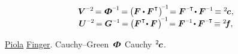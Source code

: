 \nopagebreak\vspace{-0.2em}\begin{equation}\label{moredeformationtensors.nonlinear}
\begin{array}{c}
\bm{V}^{\expminustwo} \hspace{-0.25ex}
= \mathboldPhi^{\expminusone} \hspace{-0.2ex}
= \hspace{-0.1ex} \left( \bm{F} \dotp \bm{F}^{\hspace{.1ex}\T} \hspace{.1ex} \right)^{\hspace{-0.33ex}\expminusone} \hspace{-0.4ex}
= \bm{F}^{\expminusT} \hspace{-0.3ex} \dotp \bm{F}^{\expminusone} \hspace{-0.25ex}
\equiv {^2\hspace{-0.2ex}\bm{c}}
\hspace{.1ex} ,
\\
%
\bm{U}^{\expminustwo} \hspace{-0.25ex}
= \bm{G}^{\hspace{.12ex}\expminusone} \hspace{-0.2ex}
= \hspace{-0.1ex} \left( \bm{F}^{\hspace{.1ex}\T} \hspace{-0.4ex} \dotp \bm{F} \hspace{.2ex} \right)^{\hspace{-0.33ex}\expminusone} \hspace{-0.4ex}
= \bm{F}^{\expminusone} \hspace{-0.3ex} \dotp \bm{F}^{\expminusT} \hspace{-0.3ex}
\equiv {^2\hspace{-0.4ex}\bm{f}}
\hspace{-0.1ex} ,
\end{array}
\end{equation}

\vspace{-0.2em} \noindent {}  \href{https://en.wikipedia.org/wiki/Gabrio_Piola}{Piola}  \href{https://en.wikipedia.org/wiki/Josef_Finger}{Finger}.   Cauchy--Green~${\hspace{-0.1ex}\mathboldPhi\hspace{.1ex}}$\ru{\:---} Cauchy~${\hspace{-0.2ex}^2\hspace{-0.2ex}\bm{c}}$.

